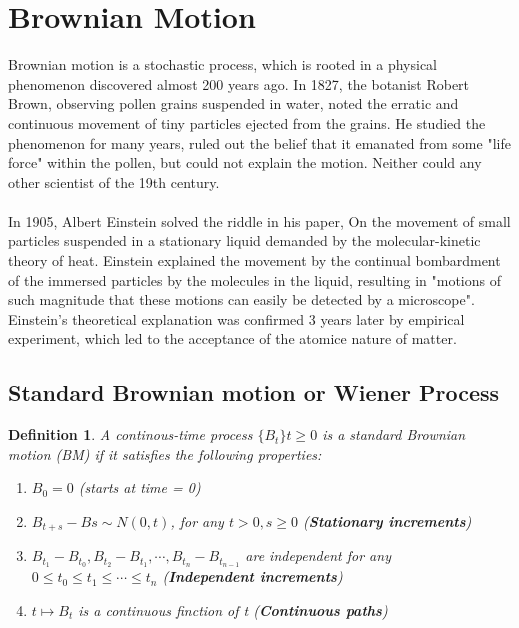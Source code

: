\documentclass[12pt]{article}
\newtheorem{definition}{Definition}
\begin{document}
\section{Brownian Motion}

Brownian motion is a stochastic process, which is rooted in a physical phenomenon discovered almost 200 years ago. In 1827, the botanist Robert Brown, observing pollen grains suspended in water, noted the erratic and continuous movement of tiny particles ejected from the grains. He studied the phenomenon for many years, ruled out the belief that it emanated from some "life force" within the pollen, but could not explain the motion. Neither could any other scientist of the 19th century.
\\
\\In 1905, Albert Einstein solved the riddle in his paper, On the movement of small particles suspended in a stationary liquid demanded by the molecular-kinetic theory of heat. Einstein explained the movement by the continual bombardment of the immersed particles by the molecules in the liquid, resulting in "motions of such magnitude that these motions can easily be detected by a microscope". Einstein's theoretical explanation was confirmed 3 years later by empirical experiment, which led to the acceptance of the atomice nature of matter.

\subsection{Standard Brownian motion or Wiener Process}

\begin{definition}
    A continous-time process $\{B_t\}t\geq0$ is a standard Brownian motion (BM) if it satisfies the following properties:
    \begin{enumerate}
        \item $B_0 = 0$ (starts at time = 0)
        \item $B_{t+s}-B{s} \sim N(0,t)$, for any $t > 0, s \geq 0$ (\textbf{Stationary increments})
        \item $B_{t_1}-B_{t_0}, B_{t_2}-B_{t_1}, \cdots, B_{t_n}-B_{t_{n-1}}$ are independent for any $0 \leq t_0 \leq t_1 \leq \cdots \leq t_n$ (\textbf{Independent increments})
        \item $t \mapsto B_t$ is a continuous finction of t (\textbf{Continuous paths})
    \end{enumerate}
\end{definition}
\end{document}
